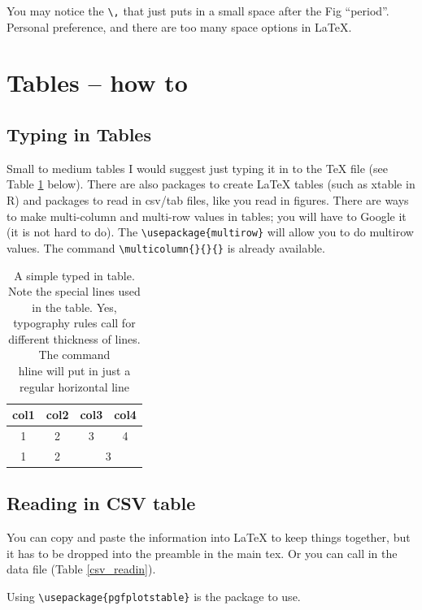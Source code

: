 You may notice the \verb+\,+ that just puts in a small space after the Fig ``period''. Personal preference, and there are too many space options in \LaTeX{}. 


\section{Tables -- how to}

\subsection{Typing in Tables}
Small to medium tables I would suggest just typing it in to the \TeX{} file (see Table \ref{simpleTable} below). There are also packages to create \LaTeX{} tables (such as xtable in R) and packages to read in csv/tab files, like you read in figures. There are ways to make multi-column and multi-row values in tables; you will have to Google it (it is not hard to do). The \verb+\usepackage{multirow}+ will allow you to do multirow values. The command \verb+\multicolumn{}{}{}+ is already available. 

\begin{table}[h]
\centering
\caption[Simple table]{A simple typed in table. Note the special lines used in the table. Yes, typography rules call for different thickness of lines. The command \\hline will put in just a regular horizontal line}
\label{simpleTable}
\begin{tabular}{c|ccc} %
\toprule
col1 & col2 & col3 & col4 \\
\midrule
1 & 2 & 3 & 4 \\
1 & 2 & \multicolumn{2}{c}{3} \\
\bottomrule
\end{tabular}
\end{table}



\subsection{Reading in CSV table}

You can copy and paste the information into \LaTeX{} to keep things together, but it has to be dropped into the preamble in the main tex. Or you can call in the data file (Table \ref{csv_readin}).

Using \verb+\usepackage{pgfplotstable}+ is the package to use.

